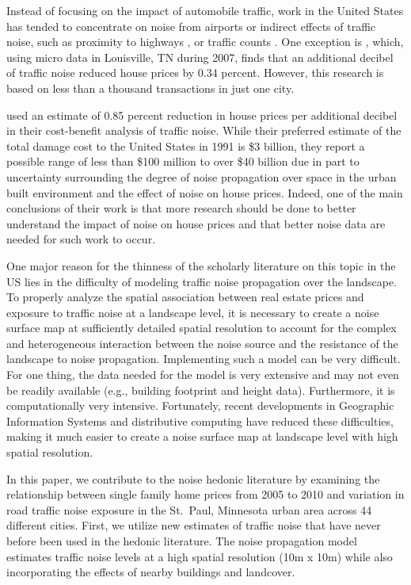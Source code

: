 \documentclass{article}\usepackage{graphicx, color}
\begin{document}
Instead of focusing on the impact of automobile traffic, work in the United States has tended to concentrate on noise from airports \citep{Espey2000, McMillen2004, Cohen2008a} or indirect effects of traffic noise, such as proximity to highways \citep{Matthews2007, Chernobai2009, Li2012}, or traffic counts \citep{HughesJr.1992, Larsen2012}. One exception is \citet{Cheng2008}, which, using micro data in Louisville, TN during 2007, finds that an additional decibel of traffic noise reduced house prices by 0.34 percent. However, this research is based on less than a thousand transactions in just one city.

\citet{Delucchi1998} used an estimate of 0.85 percent reduction in house prices per additional decibel in their cost-benefit analysis of traffic noise. While their preferred estimate of the total damage cost to the United States in 1991 is \$3 billion, they report a possible range of less than \$100 million to over \$40 billion due in part to uncertainty surrounding the degree of noise propagation over space in the urban built environment and the effect of noise on house prices. Indeed, one of the main conclusions of their work is that more research should be done to better understand the impact of noise on house prices and that better noise data are needed for such work to occur. 

One major reason for the thinness of the scholarly literature on this topic in the US lies in the difficulty of modeling traffic noise propagation over the landscape. To properly analyze the spatial association between real estate prices and exposure to traffic noise at a landscape level, it is necessary to create a noise surface map at sufficiently detailed spatial resolution to account for the complex and heterogeneous interaction between the noise source and the resistance of the landscape to noise propagation.  Implementing such a model can be very difficult.  For one thing, the data needed for the model is very extensive and may not even be readily available (e.g., building footprint and height data).  Furthermore, it is computationally very intensive. Fortunately, recent developments in Geographic Information Systems and distributive computing have reduced these difficulties, making it much easier to create a noise surface map at landscape level with high spatial resolution.  

In this paper, we contribute to the noise hedonic literature by examining the relationship between single family home prices from 2005 to 2010 and variation in road traffic noise exposure in the St.\ Paul, Minnesota urban area across 44 different cities. First, we utilize new estimates of traffic noise that have never before been used in the hedonic literature. The noise propagation model estimates traffic noise levels at a high spatial resolution (10m x 10m) while also incorporating the effects of nearby buildings and landcover. 
\end{document}
